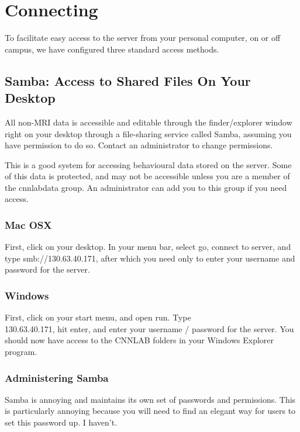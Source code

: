 \documentclass[final,titlepage,letterpaper,oneside,12pt]{article}
\renewcommand{\texttt}[2][BrickRed]{\textcolor{#1}{\ttfamily #2}}%
\begin{document}
\section{Connecting}

To facilitate easy access to the server from your personal computer, on or off campus, we have configured three standard access methods.

\subsection{Samba: Access to Shared Files On Your Desktop}

All non-MRI data is accessible and editable through the finder/explorer window right on your desktop through a file-sharing service called Samba, assuming you have permission to do so. Contact an administrator to change permissions.

This is a good system for accessing behavioural data stored on the server. Some of this data is protected, and may not be accessible unless you are a member of the \texttt{cnnlabdata} group. An administrator can add you to this group if you need access.

\subsubsection{Mac OSX}

First, click on your desktop. In your menu bar, select \texttt{go}, \texttt{connect to server}, and type \texttt{smb://130.63.40.171}, after which you need only to enter your username and password for the server.

\subsubsection{Windows}

First, click on your start menu, and open \texttt{run}. Type \texttt{\\130.63.40.171}, hit enter, and enter your username / password for the server. You should now have access to the CNNLAB folders in your Windows Explorer program.
 
\subsubsection{Administering Samba}

Samba is annoying and maintains its own set of passwords and permissions. This is particularly annoying because you will need to find an elegant way for users to set this password up. I haven't.
\end{document}
